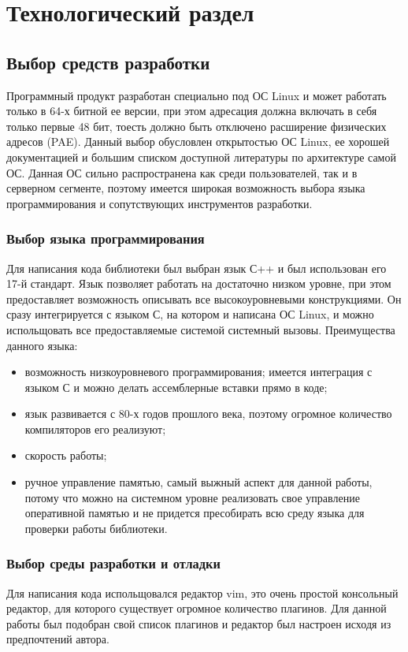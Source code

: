 \chapter{Технологический раздел}
\section{Выбор средств разработки}
Программный продукт разработан специально под ОС Linux и может работать только в 64-х битной ее версии, при этом адресация должна включать в себя только первые 48 бит, тоесть должно быть отключено расширение физических адресов (PAE). Данный выбор обусловлен открытостью ОС Linux, ее хорошей документацией и большим списком доступной литературы по архитектуре самой ОС. Данная ОС сильно распространена как среди пользователей, так и в серверном сегменте, поэтому имеется широкая возможность выбора языка программирования и сопутствующих инструментов разработки.

\subsection{Выбор языка программирования}
Для написания кода библиотеки был выбран язык С++ и был использован его 17-й стандарт. Язык позволяет работать на достаточно низком уровне, при этом предоставляет возможность описывать все высокоуровневыми конструкциями. Он сразу интегрируется с языком С, на котором и написана ОС Linux, и можно испольщовать все предоставляемые системой системный вызовы. Преимущества данного языка:
\begin{itemize}
	\item возможность низкоуровневого программирования; имеется интеграция с языком С и можно делать ассемблерные вставки прямо в коде;
	\item язык развивается с 80-х годов прошлого века, поэтому огромное количество компиляторов его реализуют;
	\item скорость работы;
	\item ручное управление памятью, самый выжный аспект для данной работы, потому что можно на системном уровне реализовать свое управление оперативной памятью и не придется пресобирать всю среду языка для проверки работы библиотеки.
\end{itemize}

\subsection{Выбор среды разработки и отладки}
Для написания кода испольщовался редактор vim, это очень простой консольный редактор, для которого существует огромное количество плагинов. Для данной работы был подобран свой список плагинов и редактор был настроен исходя из предпочтений автора.

